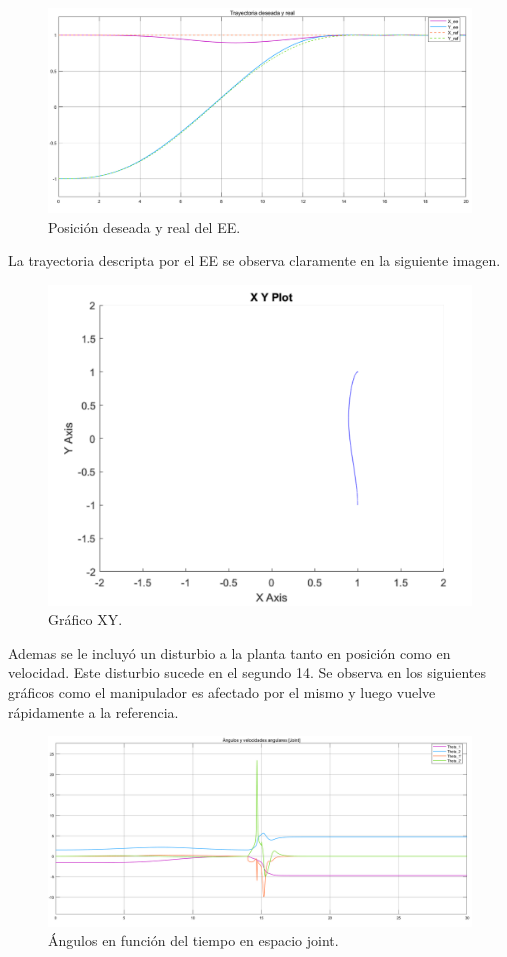 
\begin{figure}[H]
	\centering
	\includegraphics[width=0.8\linewidth]{ImagenesControl de posición no lineal/1_3_b}
	\caption{Posición deseada y real del EE.}	
	\label{fig:apos}
\end{figure}
La trayectoria descripta por el EE se observa claramente en la siguiente imagen.
\begin{figure}[H]
	\centering
	\includegraphics[width=0.5\linewidth]{ImagenesControl de posición no lineal/1_3_c}
	\caption{Gráfico XY.}	
	\label{fig:axy}
\end{figure}

Ademas se le incluyó un disturbio a la planta tanto en posición como en velocidad. Este disturbio sucede en el segundo 14. Se observa en los siguientes gráficos como el manipulador es afectado por el mismo y luego vuelve rápidamente a la referencia.

\begin{figure}[H]
	\centering
	\includegraphics[width=0.8\linewidth]{ImagenesControl de posición no lineal/1_3_e_a}
	\caption{Ángulos en función del tiempo en espacio joint.}	
	\label{fig:athetasd}
\end{figure}

